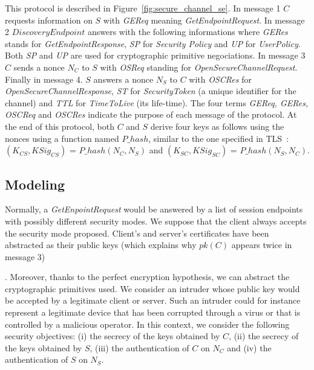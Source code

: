 This protocol is described in Figure~\ref{fig:secure_channel_se}.  In
message 1 $C$ requests information on $S$ with {\em GEReq} meaning
{\em GetEndpointRequest}.  In message 2 $DiscoveryEndpoint$ answers
with the following  informations where {\em GERes} stands for {\em
  GetEndpointResponse}, {\em SP} for {\em Security Policy} and {\em
  UP} for {\em UserPolicy}.  Both {\em SP} and {\em UP} are used for
cryptographic primitive negociations.  In message 3 $C$ sends a nonce
 $N_{C}$ to $S$ with {\em OSReq} standing for {\em
  OpenSecureChannelRequest}.  Finally in message 4. $S$ answers a
nonce $N_{S}$ to $C$ with {\em OSCRes} for {\em
  OpenSecureChannelResponse}, {\em ST} for {\em SecurityToken} (a
unique identifier for the channel) and {\em TTL} for {\em TimeToLive}
(its life-time).  The four terms {\em GEReq, GERes, OSCReq} and {\em
  OSCRes} indicate the purpose of each message of the protocol.  At
the end of this protocol, both $C$ and $S$ derive four keys as follows using the
nonces using a function named $P\_hash$, similar to the one specified
in TLS~\cite{DR08}: $(K_{CS}, KSig_{CS})$ = $P\_hash(N_{C}, N_{S})$
and $(K_{SC}, KSig_{SC})$ = $P\_hash(N_{S}, N_{C})$.

\subsection{Modeling}

Normally, a {\em GetEnpointRequest} would be answered by a list of
session endpoints with possibly different security modes. We suppose
that the client always accepts the security mode proposed.  Client's
and server's certificates have been abstracted as their public keys
(which explains why $pk(C)$ appears twice in message 3)

.  Moreover,
thanks to the perfect encryption hypothesis, we can abstract the
cryptographic primitives used.  We consider an intruder whose public
key would be accepted by a legitimate client or server.  Such an
intruder could for instance represent a legitimate device that has
been corrupted through a virus or that is controlled by a malicious
operator.
In this context, we consider the following security objectives: (i)
the secrecy of the keys obtained by $C$, (ii) the secrecy of the keys obtained
by $S$, (iii) the authentication of $C$ on $N_{C}$ and (iv) the authentication of $S$
on $N_{S}$.

